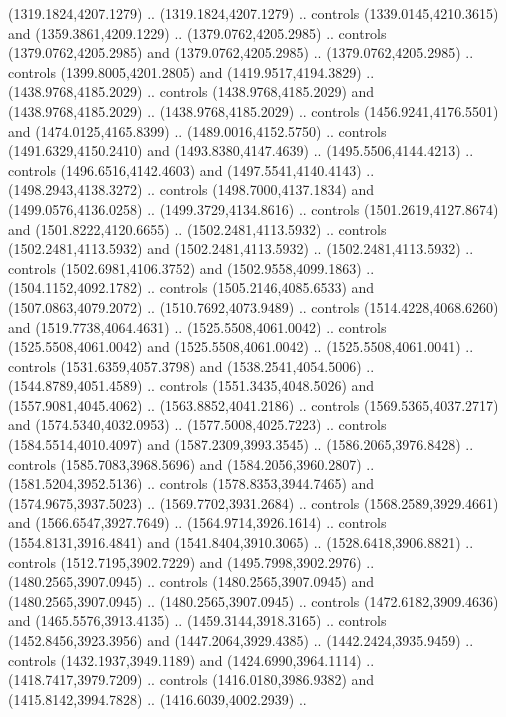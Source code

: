 \begin{scope}[shift={(-343.28256,-575.56596)}]
\begin{scope}[shift={(-736.04956,-3272.8657)}]
      (1319.1824,4207.1279) .. (1319.1824,4207.1279) .. controls
      (1339.0145,4210.3615) and (1359.3861,4209.1229) .. (1379.0762,4205.2985) ..
      controls (1379.0762,4205.2985) and (1379.0762,4205.2985) ..
      (1379.0762,4205.2985) .. controls (1399.8005,4201.2805) and
      (1419.9517,4194.3829) .. (1438.9768,4185.2029) .. controls
      (1438.9768,4185.2029) and (1438.9768,4185.2029) .. (1438.9768,4185.2029) ..
      controls (1456.9241,4176.5501) and (1474.0125,4165.8399) ..
      (1489.0016,4152.5750) .. controls (1491.6329,4150.2410) and
      (1493.8380,4147.4639) .. (1495.5506,4144.4213) .. controls
      (1496.6516,4142.4603) and (1497.5541,4140.4143) .. (1498.2943,4138.3272) ..
      controls (1498.7000,4137.1834) and (1499.0576,4136.0258) ..
      (1499.3729,4134.8616) .. controls (1501.2619,4127.8674) and
      (1501.8222,4120.6655) .. (1502.2481,4113.5932) .. controls
      (1502.2481,4113.5932) and (1502.2481,4113.5932) .. (1502.2481,4113.5932) ..
      controls (1502.6981,4106.3752) and (1502.9558,4099.1863) ..
      (1504.1152,4092.1782) .. controls (1505.2146,4085.6533) and
      (1507.0863,4079.2072) .. (1510.7692,4073.9489) .. controls
      (1514.4228,4068.6260) and (1519.7738,4064.4631) .. (1525.5508,4061.0042) ..
      controls (1525.5508,4061.0042) and (1525.5508,4061.0042) ..
      (1525.5508,4061.0041) .. controls (1531.6359,4057.3798) and
      (1538.2541,4054.5006) .. (1544.8789,4051.4589) .. controls
      (1551.3435,4048.5026) and (1557.9081,4045.4062) .. (1563.8852,4041.2186) ..
      controls (1569.5365,4037.2717) and (1574.5340,4032.0953) ..
      (1577.5008,4025.7223) .. controls (1584.5514,4010.4097) and
      (1587.2309,3993.3545) .. (1586.2065,3976.8428) .. controls
      (1585.7083,3968.5696) and (1584.2056,3960.2807) .. (1581.5204,3952.5136) ..
      controls (1578.8353,3944.7465) and (1574.9675,3937.5023) ..
      (1569.7702,3931.2684) .. controls (1568.2589,3929.4661) and
      (1566.6547,3927.7649) .. (1564.9714,3926.1614) .. controls
      (1554.8131,3916.4841) and (1541.8404,3910.3065) .. (1528.6418,3906.8821) ..
      controls (1512.7195,3902.7229) and (1495.7998,3902.2976) ..
      (1480.2565,3907.0945) .. controls (1480.2565,3907.0945) and
      (1480.2565,3907.0945) .. (1480.2565,3907.0945) .. controls
      (1472.6182,3909.4636) and (1465.5576,3913.4135) .. (1459.3144,3918.3165) ..
      controls (1452.8456,3923.3956) and (1447.2064,3929.4385) ..
      (1442.2424,3935.9459) .. controls (1432.1937,3949.1189) and
      (1424.6990,3964.1114) .. (1418.7417,3979.7209) .. controls
      (1416.0180,3986.9382) and (1415.8142,3994.7828) .. (1416.6039,4002.2939) ..

\end{scope}
\end{scope}
